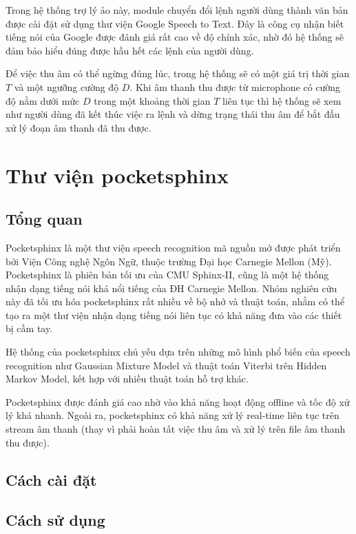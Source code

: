 Trong hệ thống trợ lý ảo này, module chuyển đổi lệnh người dùng thành văn bản được cài đặt sử dụng thư viện Google Speech to Text. Đây là công cụ nhận biết tiếng nói của Google được đánh giá rất cao về độ chính xác, nhờ đó hệ thống sẽ đảm bảo hiểu đúng được hầu hết các lệnh của người dùng.

Để việc thu âm có thể ngừng đúng lúc, trong hệ thống sẽ có một giá trị thời gian $T$ và một ngưỡng cường độ $D$. Khi âm thanh thu được từ microphone có cường độ nằm dưới mức $D$ trong một khoảng thời gian $T$ liên tục thì hệ thống sẽ xem như người dùng đã kết thúc việc ra lệnh và dừng trạng thái thu âm để bắt đầu xử lý đoạn âm thanh đã thu được.

\section{Thư viện pocketsphinx}

\subsection{Tổng quan}

Pocketsphinx là một thư viện speech recognition mã nguồn mở được phát triển bởi Viện Công nghệ Ngôn Ngữ, thuộc trường Đại học Carnegie Mellon (Mỹ). Pocketsphinx là phiên bản tối ưu của CMU Sphinx-II, cũng là một hệ thống nhận dạng tiếng nói khá nổi tiếng của ĐH Carnegie Mellon. Nhóm nghiên cứu này đã tối ưu hóa pocketsphinx rất nhiều về bộ nhớ và thuật toán, nhằm có thể tạo ra một thư viện nhận dạng tiếng nói liên tục có khả năng đưa vào các thiết bị cầm tay.

Hệ thống của pocketsphinx chủ yếu dựa trên những mô hình phổ biến của speech recognition như Gaussian Mixture Model và thuật toán Viterbi trên Hidden Markov Model, kết hợp với nhiều thuật toán hỗ trợ khác\cite{huggins2006pocketsphinx}.

Pocketsphinx được đánh giá cao nhờ vào khả năng hoạt động offline và tốc độ xử lý khá nhanh. Ngoài ra, pocketsphinx có khả năng xử lý real-time liên tục trên stream âm thanh (thay vì phải hoàn tất việc thu âm và xử lý trên file âm thanh thu được).

\subsection{Cách cài đặt}

\subsection{Cách sử dụng}

